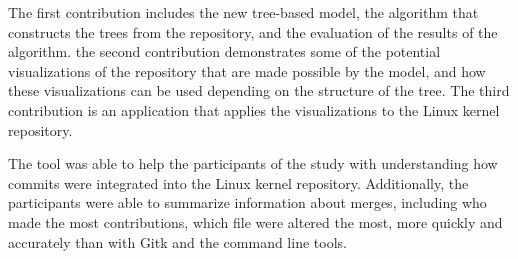 \begin{flushleft}
  The first contribution includes the new tree-based model, the
  algorithm that constructs the trees from the repository,
  and the evaluation of the results of the algorithm.
  the second contribution demonstrates some of the potential
  visualizations of the repository that are made possible by the model,
  and how these visualizations can be used depending on the structure of
  the tree.
  The third contribution is an application that applies the
  visualizations to the Linux kernel repository.

  The tool was able to help the participants of the study with
  understanding how commits were integrated into the Linux kernel
  repository.
  Additionally, the participants were able to summarize information
  about merges,
  including who made the most contributions,
  which file were altered the most,
  more quickly and accurately than with Gitk and the command line tools.
\end{flushleft}

